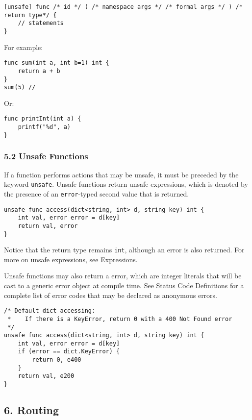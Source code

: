 \documentclass[]{article}
\begin{document}
\begin{verbatim}
[unsafe] func /* id */ ( /* namespace args */ /* formal args */ ) /* return type*/ {
    // statements
}
\end{verbatim}

For example:

\begin{verbatim}
func sum(int a, int b=1) int {
    return a + b
}
sum(5) //
\end{verbatim}

Or:

\begin{verbatim}
func printInt(int a) {
    printf("%d", a)
}
\end{verbatim}

\subsubsection{5.2 Unsafe Functions}\label{unsafe-functions}

If a function performs actions that may be unsafe, it must be preceded
by the keyword \texttt{unsafe}. Unsafe functions return unsafe
expressions, which is denoted by the presence of an \texttt{error}-typed
second value that is returned.

\begin{verbatim}
unsafe func access(dict<string, int> d, string key) int {
    int val, error error = d[key]
    return val, error
}
\end{verbatim}

Notice that the return type remains \texttt{int}, although an error is
also returned. For more on unsafe expressions, see Expressions.

Unsafe functions may also return a error, which are integer literals
that will be cast to a generic error object at compile time. See Status
Code Definitions for a complete list of error codes that may be declared
as anonymous errors.

\begin{verbatim}
/* Default dict accessing:
 *    If there is a KeyError, return 0 with a 400 Not Found error
 */
unsafe func access(dict<string, int> d, string key) int {
    int val, error error = d[key]
    if (error == dict.KeyError) {
        return 0, e400
    }
    return val, e200
}
\end{verbatim}

\subsection{6. Routing}\label{routing}
\end{document}
